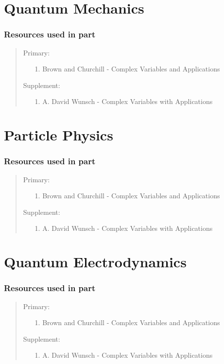 \documentclass[12pt, english]{book}
\newenvironment{partintro}
{\vspace*{\fill}
	\section*{\centering Resources used in part \thepart}
	\begin{quotation}}
	{\end{quotation}\vspace*{\fill}\newpage}
\begin{document}
	\part{Quantum Mechanics} \label{Quantum Mechanics Part}
	\begin{partintro}
		\noindent Primary:
		\begin{itemize}
			\item[1.] Brown and Churchill - Complex Variables and Applications
		\end{itemize}
		Supplement: 
		\begin{itemize}
			\item[1.] A. David Wunsch - Complex Variables with Applications
		\end{itemize}
	\end{partintro}

	\part{Particle Physics} \label{Particle Physics Part}
	\begin{partintro}
		\noindent Primary:
		\begin{itemize}
			\item[1.] Brown and Churchill - Complex Variables and Applications
		\end{itemize}
		Supplement: 
		\begin{itemize}
			\item[1.] A. David Wunsch - Complex Variables with Applications
		\end{itemize}
	\end{partintro}

	\part{Quantum Electrodynamics} \label{Quantum Electrodynamics Part}
	\begin{partintro}
		\noindent Primary:
		\begin{itemize}
			\item[1.] Brown and Churchill - Complex Variables and Applications
		\end{itemize}
		Supplement: 
		\begin{itemize}
			\item[1.] A. David Wunsch - Complex Variables with Applications
		\end{itemize}
	\end{partintro}
\end{document}
